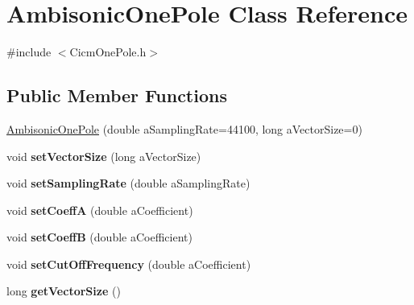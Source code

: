 \hypertarget{class_ambisonic_one_pole}{\section{Ambisonic\-One\-Pole Class Reference}
\label{class_ambisonic_one_pole}
}


{\ttfamily \#include $<$Cicm\-One\-Pole.\-h$>$}

\subsection*{Public Member Functions}
\begin{DoxyCompactItemize}
\item 
\hyperlink{class_ambisonic_one_pole_accd0ce7548ef7d6669519769c13eeded}{Ambisonic\-One\-Pole} (double a\-Sampling\-Rate=44100, long a\-Vector\-Size=0)
\item 
\hypertarget{class_ambisonic_one_pole_a2d97c8d963dce210a9e8ea8f173f097c}{void {\bfseries set\-Vector\-Size} (long a\-Vector\-Size)}\label{class_ambisonic_one_pole_a2d97c8d963dce210a9e8ea8f173f097c}

\item 
\hypertarget{class_ambisonic_one_pole_a702746459e8377e6315d6b7d2459f205}{void {\bfseries set\-Sampling\-Rate} (double a\-Sampling\-Rate)}\label{class_ambisonic_one_pole_a702746459e8377e6315d6b7d2459f205}

\item 
\hypertarget{class_ambisonic_one_pole_ab4e7e2d7af203355b57a9ff6a35e70f4}{void {\bfseries set\-Coeff\-A} (double a\-Coefficient)}\label{class_ambisonic_one_pole_ab4e7e2d7af203355b57a9ff6a35e70f4}

\item 
\hypertarget{class_ambisonic_one_pole_ace9d1d8b2d27100c126d7e2a57dd0aac}{void {\bfseries set\-Coeff\-B} (double a\-Coefficient)}\label{class_ambisonic_one_pole_ace9d1d8b2d27100c126d7e2a57dd0aac}

\item 
\hypertarget{class_ambisonic_one_pole_a9aecab388d468a2bf741ec851daeec2c}{void {\bfseries set\-Cut\-Off\-Frequency} (double a\-Coefficient)}\label{class_ambisonic_one_pole_a9aecab388d468a2bf741ec851daeec2c}

\item 
\hypertarget{class_ambisonic_one_pole_a2e9fc166a7ee3d43ccadfe6f3308220c}{long {\bfseries get\-Vector\-Size} ()}\label{class_ambisonic_one_pole_a2e9fc166a7ee3d43ccadfe6f3308220c}


\end{DoxyCompactItemize}
